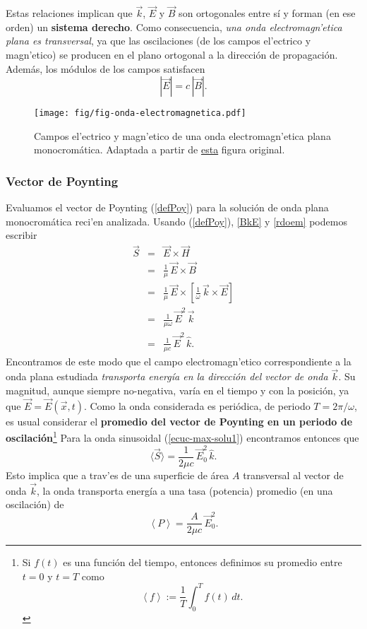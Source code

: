 Estas relaciones implican que $\vec{k}$, $\vec{E}$ y $\vec{B}$ son ortogonales
entre sí y forman (en ese orden) un \textbf{sistema derecho}. Como consecuencia, \textit{una onda electromagn'etica plana es transversal}, ya que las oscilaciones (de los campos el'ectrico y magn'etico) se producen en el plano ortogonal a la dirección de propagación. Además, los módulos de los campos satisfacen
\begin{equation}
 | \vec{E}|=c\,| \vec{B}| .
\end{equation}
\begin{figure}[!h]
\centerline{\texttt{[image: fig/fig-onda-electromagnetica.pdf]}}
\caption{Campos el'ectrico y magn'etico de una onda electromagn'etica plana monocromática. Adaptada a partir de \href{http://commons.wikimedia.org/wiki/File:Onde_electromagnetique.svg}{esta} figura original.}
\label{ondaem}
\end{figure}

\subsubsection{Vector de Poynting}
Evaluamos el vector de Poynting (\ref{defPoy}) para la solución de onda plana monocromática reci'en analizada. Usando (\ref{defPoy}), \eqref{BkE} y \eqref{rdoem} podemos escribir
\begin{eqnarray}
 \vec{S}&=&\vec{E}\times\vec{H} \\
&=&\frac{1}{\mu}\,\vec{E}\times\vec{B} \\
&=&\frac{1}{\mu}\,\vec{E}\times\left[\frac{1}{\omega}\,\vec{k}\times\vec{E}
\right] \\
&=&\frac{1}{\mu\omega}\,\vec{E}^2\,\vec{k}\\
&=&\frac{1}{\mu c}\,\vec{E}^2\,\hat{k}. \label{Sop}
\end{eqnarray}
Encontramos de este modo que el campo electromagn'etico correspondiente a la onda plana estudiada \textit{transporta energía en la dirección del vector de onda $\vec{k}$}. Su magnitud, aunque siempre no-negativa, varía en el tiempo y con la posición, ya que $\vec{E}=\vec{E}(\vec{x},t)$. Como la onda considerada es periódica, de periodo $T=2\pi/\omega$, es usual considerar el \textbf{promedio del vector de Poynting en un periodo de oscilación}\footnote{Si $f(t)$ es una función del tiempo, entonces definimos su promedio entre $t=0$ y $t=T$ como 
\begin{equation}
\left<f\right>:=\frac{1}{T}\int_0^Tf(t)\,dt.
\end{equation}}
Para la onda sinusoidal (\ref{ecuc-max-solu1}) encontramos entonces que
\begin{equation}\label{Sprom}
\langle\vec{S}\rangle=\frac{1}{2\mu c}\,\vec{E}_0^2\,\hat{k}.
\end{equation}
Esto implica que a trav'es de una superficie de área $A$ transversal al vector de onda $\vec{k}$, la onda transporta energía a una tasa (potencia) promedio (en una oscilación) de 
\begin{equation}
 \left<P\right>=\frac{A}{2\mu c}\,\vec{E}_0^2.
\end{equation}

